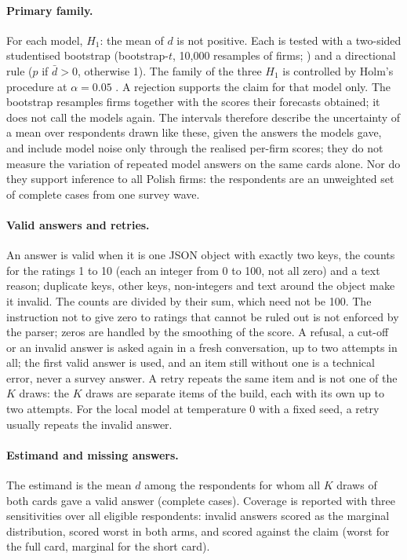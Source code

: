 \documentclass[11pt]{article}
\begin{document}
\paragraph{Primary family.} For each model, $H_1$: the mean of $d$ is not positive. Each is tested with a two-sided
studentised bootstrap (bootstrap-$t$, 10{,}000 resamples of firms; \citealp{hall1992,efron1993}) and a directional
rule ($p$ if $\bar d>0$, otherwise 1). The family of the three $H_1$ is controlled by Holm's procedure at $\alpha=0.05$
\citep{holm1979}. A rejection supports the claim for that model only. The bootstrap resamples firms together with the
scores their forecasts obtained; it does not call the models again. The intervals therefore describe the uncertainty
of a mean over respondents drawn like these, given the answers the models gave, and include model noise only through
the realised per-firm scores; they do not measure the variation of repeated model answers on the same cards alone.
Nor do they support inference to all Polish firms: the respondents are an unweighted set of complete cases from one
survey wave.

\paragraph{Valid answers and retries.} An answer is valid when it is one JSON object with exactly two keys, the counts
for the ratings 1 to 10 (each an integer from 0 to 100, not all zero) and a text reason; duplicate keys, other keys,
non-integers and text around the object make it invalid. The counts are divided by their sum, which need not be 100.
The instruction not to give zero to ratings that cannot be ruled out is not enforced by the parser; zeros are handled
by the smoothing of the score. A refusal, a cut-off or an invalid answer is asked again in a fresh conversation, up to
two attempts in all; the first valid answer is used, and an item still without one is a technical error, never a
survey answer. A retry repeats the same item and is not one of the $K$ draws: the $K$ draws are separate items of the
build, each with its own up to two attempts. For the local model at temperature 0 with a fixed seed, a retry usually
repeats the invalid answer.

\paragraph{Estimand and missing answers.} The estimand is the mean $d$ among the respondents for whom all $K$ draws of
both cards gave a valid answer (complete cases). Coverage is reported with three sensitivities over all eligible
respondents: invalid answers scored as the marginal distribution, scored worst in both arms, and scored against the
claim (worst for the full card, marginal for the short card).
\end{document}
